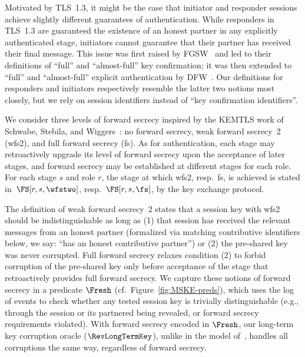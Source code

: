 Motivated by TLS~1.3, it might be the case that initiator and responder sessions achieve slightly different guarantees of authentication.
While responders in TLS~1.3 are guaranteed the existence of an honest partner in any explicitly authenticated stage, initiators cannot guarantee that their partner has received their final message.
This issue was first raised by FGSW~\cite{SP:FGSW16} and led to their definitions of ``full'' and ``almost-full'' key confirmation; it was then extended to ``full'' and ``almost-full'' explicit authentication by DFW~\cite{CSF:deSFisWar20}. 
Our definitions for responders and initiators respectively resemble the latter two notions most closely, but we rely on session identifiers instead of ``key confirmation identifiers''.

We consider three levels of forward secrecy inspired by the KEMTLS work of Schwabe, Stebila, and Wiggers~\cite{CCS:SchSteWig20}: no forward secrecy, weak forward secrecy~2 (wfs2), %
and full forward secrecy (fs). 
As for authentication, each stage may retroactively upgrade its level of forward secrecy upon the acceptance of later stages, and  forward secrecy may be established at different stages for each role.
For each stage $s$ and role $r$, the stage at which wfs2, resp.\ fs, is achieved is stated in~$\FS[r, s, \wfstwo]$, resp.\ $\FS[r, s, \fs]$, by the key exchange protocol.

The definition of weak forward secrecy~2 states that a session key with wfs2 should be indistinguishable as long as
(1) that session has received the relevant messages from an honest partner (formalized via matching contributive identifiers below, we say: ``has an honest contributive partner'')
or (2) the pre-shared key was never corrupted.
Full forward secrecy relaxes condition (2) to forbid corruption of the pre-shared key only before acceptance of the stage that retroactively provides full forward secrecy. 
We capture these notions of forward secrecy in a predicate $\Fresh$ (cf.\ Figure~\ref{fig:MSKE-preds}), which uses the log of events to check whether any tested session key is trivially distinguishable
(e.g., through the session or its partnered being revealed, or forward secrecy requirements violated).
With forward secrecy encoded in $\Fresh$, our long-term key corruption oracle ($\RevLongTermKey$), unlike in the model of~\cite{JC:DFGS21}, handles all corruptions the same way, regardless of forward secrecy. 

